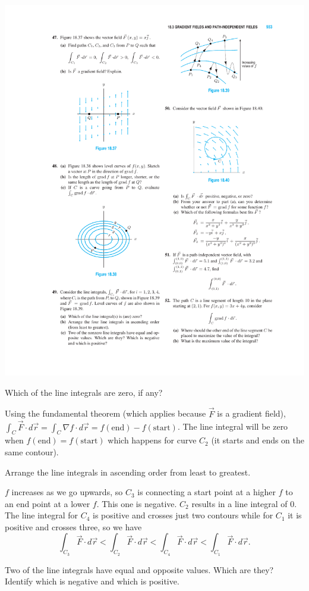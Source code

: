 \documentclass[12pt,letterpaper,noanswers]{exam}
\begin{document}
\begin{questions}
\includegraphics{img/HW09p1.pdf}

\begin{parts}
\item Which of the line integrals are zero, if any?
\begin{solution}
Using the fundamental theorem (which applies because $\vec F$ is a gradient field), $\int_C \vec F\cdot d\vec r = \int_C \nabla f\cdot d\vec r = f(\text{end})-f(\text{start})$.  The line integral will be zero when $f(\text{end}) = f(\text{start})$ which happens for curve $C_2$ (it starts and ends on the same contour).
\end{solution}
\item Arrange the line integrals in ascending order from least to greatest.
\begin{solution}
$f$ increases as we go upwards, so $C_3$ is connecting a start point at a higher $f$ to an end point at a lower $f$.  This one is negative.  $C_2$ results in a line integral of $0$.  The line integral for $C_4$ is positive and crosses just two contours while for $C_1$ it is positive and crosses three, so we have
\[\int_{C_3} \vec F\cdot d\vec r < \int_{C_2} \vec F\cdot d\vec r < \int_{C_4} \vec F\cdot d\vec r < \int_{C_1} \vec F\cdot d\vec r.\]
\end{solution}
\item Two of the line integrals have equal and opposite values.  Which are they?  Identify which is negative and which is positive.


\end{parts}
\end{questions}
\end{document}
